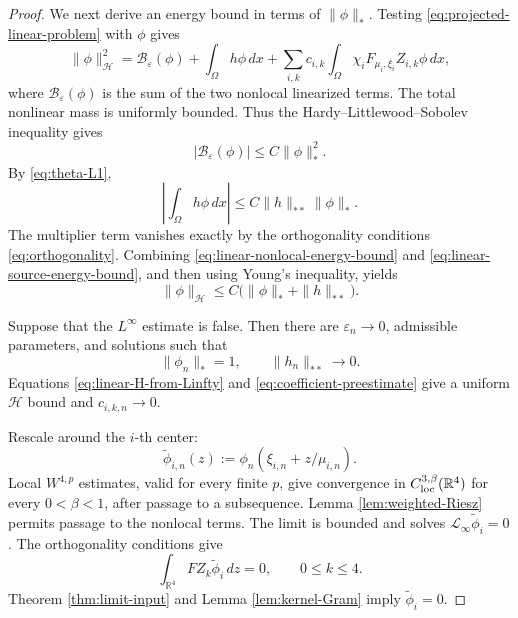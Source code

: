 \documentclass[11pt]{article}
\numberwithin{equation}{section}
\begin{document}
\begin{proof}
We next derive an energy bound in terms of $\|\phi\|_*$.
Testing \eqref{eq:projected-linear-problem} with $\phi$ gives
\begin{equation*}
\|\phi\|_{\mathcal H}^2
=\mathcal B_\varepsilon(\phi)
+\int_\Omega h\phi\,dx
+\sum_{i,k}c_{i,k}
\int_\Omega\chi_iF_{\mu_i,\xi_i}Z_{i,k}\phi\,dx,
\end{equation*}
where $\mathcal B_\varepsilon(\phi)$ is the sum of the two nonlocal
linearized terms. The total nonlinear mass is uniformly bounded.
Thus the Hardy--Littlewood--Sobolev inequality gives
\begin{equation}\label{eq:linear-nonlocal-energy-bound}
|\mathcal B_\varepsilon(\phi)|
\leq C\|\phi\|_*^2.
\end{equation}
By \eqref{eq:theta-L1},
\begin{equation}\label{eq:linear-source-energy-bound}
\left|\int_\Omega h\phi\,dx\right|
\leq C\|h\|_{**}\|\phi\|_*.
\end{equation}
The multiplier term vanishes exactly by the orthogonality
conditions \eqref{eq:orthogonality}. Combining
\eqref{eq:linear-nonlocal-energy-bound} and
\eqref{eq:linear-source-energy-bound}, and then using Young's
inequality, yields
\begin{equation}\label{eq:linear-H-from-Linfty}
\|\phi\|_{\mathcal H}
\leq C\bigl(\|\phi\|_*+\|h\|_{**}\bigr).
\end{equation}

Suppose that the $L^\infty$ estimate is false. Then there are
$\varepsilon_n\to0$, admissible parameters, and solutions such that
\begin{equation}\label{eq:linear-contradiction-normalization}
\|\phi_n\|_*=1,
\qquad
\|h_n\|_{**}\to0.
\end{equation}
Equations \eqref{eq:linear-H-from-Linfty} and
\eqref{eq:coefficient-preestimate} give a uniform $\mathcal H$ bound
and $c_{i,k,n}\to0$.

Rescale around the $i$-th center:
\begin{equation*}
\widetilde\phi_{i,n}(z)
:=\phi_n(\xi_{i,n}+z/\mu_{i,n}).
\end{equation*}
Local $W^{4,p}$ estimates, valid for every finite $p$, give
convergence in $C^{3,\beta}_{\rm loc}(\mathbb R^4)$ for every
$0<\beta<1$, after passage to a subsequence. Lemma
\ref{lem:weighted-Riesz} permits passage to the nonlocal terms. The
limit is bounded and solves
$\mathcal L_\infty\widetilde\phi_i=0$. The orthogonality conditions
give
\begin{equation*}
\int_{\mathbb R^4}FZ_k\widetilde\phi_i\,dz=0,
\qquad 0\leq k\leq4.
\end{equation*}
Theorem \ref{thm:limit-input} and Lemma \ref{lem:kernel-Gram} imply
$\widetilde\phi_i=0$.


\end{proof}
\end{document}
